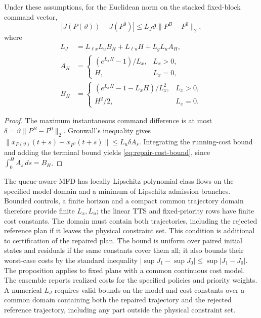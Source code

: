 \begin{proposition}
\label{prop:repair-cost}
Under these assumptions, for the Euclidean norm on the stacked fixed-block
command vector,
\begin{equation}
|J(P(\vartheta))-J(P^0)|
\le L_J\vartheta\|P^B-P^0\|_2,
\label{eq:repair-cost-bound}
\end{equation}
where
\begin{align*}
L_J&=L_{\ell x}L_u B_H+L_{\ell u}H+L_gL_u A_H,\\
A_H&=\begin{cases}(e^{L_xH}-1)/L_x,&L_x>0,\\H,&L_x=0,\end{cases}\\
B_H&=\begin{cases}(e^{L_xH}-1-L_xH)/L_x^2,&L_x>0,\\H^2/2,&L_x=0.\end{cases}
\end{align*}
\end{proposition}
\begin{proof}
The maximum instantaneous command difference is at most
$\delta=\vartheta\|P^B-P^0\|_2$. Gronwall's inequality gives
$\|x_{P(\vartheta)}(t+s)-x_{P^0}(t+s)\|\le L_u\delta A_s$.
Integrating the running-cost bound and adding the terminal bound yields
\eqref{eq:repair-cost-bound}, since $\int_0^H A_s\,ds=B_H$.
\end{proof}

The queue-aware MFD has locally Lipschitz polynomial class flows on the
specified model domain and a minimum of Lipschitz admission branches.
Bounded controls, a finite horizon and a compact common trajectory domain
therefore provide finite $L_x,L_u$; the linear TTS and fixed-priority rows
have finite cost constants. The domain must contain both trajectories,
including the rejected reference plan if it leaves the physical constraint
set. This condition is additional to certification of the repaired plan.
The bound is uniform over paired initial states and residuals if the same
constants cover them all; it also bounds their worst-case costs by the
standard inequality $|\sup J_1-\sup J_0|\le\sup|J_1-J_0|$.
The proposition applies to fixed plans with a common continuous cost model.
The ensemble reports realized costs for the specified policies and
priority weights. A numerical $L_J$ requires valid bounds on the model and
cost constants over a common domain containing both the repaired trajectory
and the rejected reference trajectory, including any part outside the
physical constraint set.

\FloatBarrier
